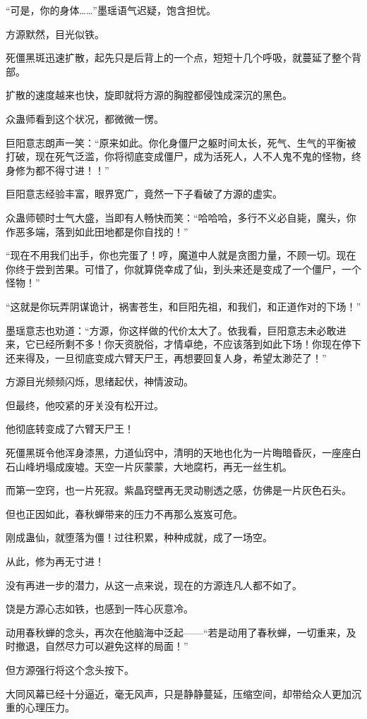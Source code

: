 \begin{this_body}
“可是，你的身体……”墨瑶语气迟疑，饱含担忧。

方源默然，目光似铁。

死僵黑斑迅速扩散，起先只是后背上的一个点，短短十几个呼吸，就蔓延了整个背部。

扩散的速度越来也快，旋即就将方源的胸膛都侵蚀成深沉的黑色。

众蛊师看到这个状况，都微微一愣。

巨阳意志朗声一笑：“原来如此。你化身僵尸之躯时间太长，死气、生气的平衡被打破，现在死气泛滥，你将彻底变成僵尸，成为活死人，人不人鬼不鬼的怪物，终身修为都不得寸进！！”

巨阳意志经验丰富，眼界宽广，竟然一下子看破了方源的虚实。

众蛊师顿时士气大盛，当即有人畅快而笑：“哈哈哈，多行不义必自毙，魔头，你作恶多端，落到如此田地都是你自找的！”

“现在不用我们出手，你也完蛋了！哼，魔道中人就是贪图力量，不顾一切。现在你终于尝到苦果。可惜了，你就算侥幸成了仙，到头来还是变成了一个僵尸，一个怪物！”

“这就是你玩弄阴谋诡计，祸害苍生，和巨阳先祖，和我们，和正道作对的下场！”

墨瑶意志也劝道：“方源，你这样做的代价太大了。依我看，巨阳意志未必敢进来，它已经所剩不多！你天资脱俗，才情卓绝，不应该落到如此下场！你现在停下还来得及，一旦彻底变成六臂天尸王，再想要回复人身，希望太渺茫了！”

方源目光频频闪烁，思绪起伏，神情波动。

但最终，他咬紧的牙关没有松开过。

他彻底转变成了六臂天尸王！

死僵黑斑令他浑身漆黑，力道仙窍中，清明的天地也化为一片晦暗昏灰，一座座白石山峰坍塌成废墟。天空一片灰蒙蒙，大地腐朽，再无一丝生机。

而第一空窍，也一片死寂。紫晶窍壁再无灵动剔透之感，仿佛是一片灰色石头。

但也正因如此，春秋蝉带来的压力不再那么岌岌可危。

刚成蛊仙，就堕落为僵！过往积累，种种成就，成了一场空。

从此，修为再无寸进！

没有再进一步的潜力，从这一点来说，现在的方源连凡人都不如了。

饶是方源心志如铁，也感到一阵心灰意冷。

动用春秋蝉的念头，再次在他脑海中泛起——“若是动用了春秋蝉，一切重来，及时撤退，自然尽力可以避免这样的局面！”

但方源强行将这个念头按下。

大同风幕已经十分逼近，毫无风声，只是静静蔓延，压缩空间，却带给众人更加沉重的心理压力。


\end{this_body}
